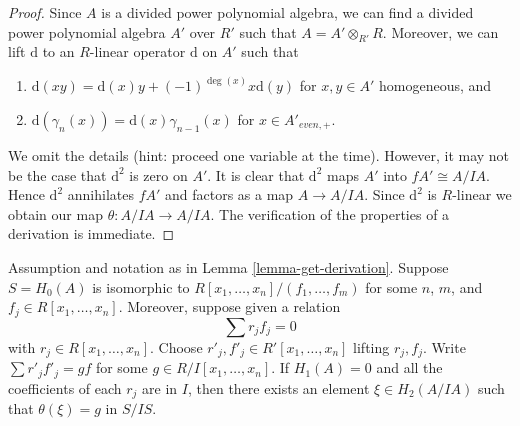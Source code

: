 \begin{proof}
Since $A$ is a divided power polynomial algebra, we can find a divided
power polynomial algebra $A'$ over $R'$ such that $A = A' \otimes_{R'} R$.
Moreover, we can lift $\text{d}$ to an $R$-linear
operator $\text{d}$ on $A'$ such that
\begin{enumerate}
\item  $\text{d}(xy) = \text{d}(x)y + (-1)^{\deg(x)}x \text{d}(y)$
for $x, y \in A'$ homogeneous, and
\item  $\text{d}(\gamma_n(x)) = \text{d}(x) \gamma_{n - 1}(x)$ for
$x \in A'_{even, +}$.
\end{enumerate}
We omit the details (hint: proceed one variable at the time).
However, it may not be the case that $\text{d}^2$
is zero on $A'$. It is clear that $\text{d}^2$ maps $A'$ into
$fA' \cong A/IA$. Hence $\text{d}^2$ annihilates $fA'$ and factors
as a map $A \to A/IA$. Since $\text{d}^2$ is $R$-linear we obtain
our map $\theta : A/IA \to A/IA$. The verification of the properties
of a derivation is immediate.
\end{proof}

\begin{lemma}
\label{lemma-compute-theta}
Assumption and notation as in Lemma \ref{lemma-get-derivation}.
Suppose $S = H_0(A)$ is isomorphic to
$R[x_1, \ldots, x_n]/(f_1, \ldots, f_m)$
for some $n$, $m$, and $f_j \in R[x_1, \ldots, x_n]$.
Moreover, suppose given a relation
$$
\sum r_j f_j = 0
$$
with $r_j \in R[x_1, \ldots, x_n]$.
Choose $r'_j, f'_j \in R'[x_1, \ldots, x_n]$ lifting $r_j, f_j$.
Write $\sum r'_j f'_j = gf$ for some $g \in R/I[x_1, \ldots, x_n]$.
If $H_1(A) = 0$ and all the coefficients of each $r_j$ are in $I$, then
there exists an element $\xi \in H_2(A/IA)$ such that
$\theta(\xi) = g$ in $S/IS$.
\end{lemma}

